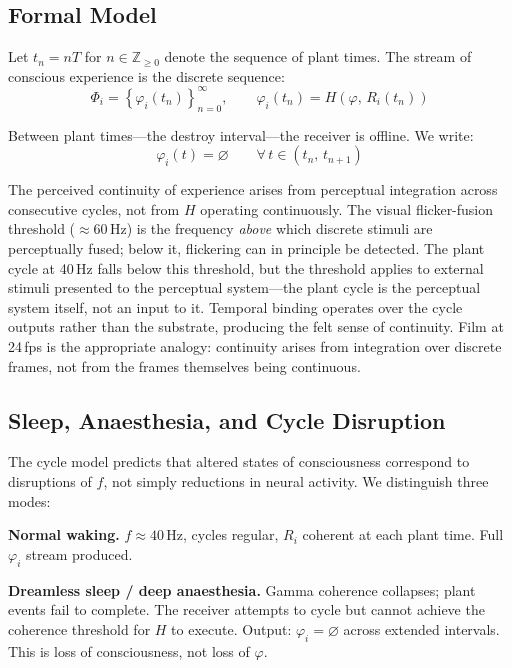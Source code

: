 \documentclass[12pt]{article}
\begin{document}
\subsection{Formal Model}

Let $t_n = nT$ for $n \in \mathbb{Z}_{\geq 0}$ denote the sequence of plant times. The stream of conscious experience is the discrete sequence:
\begin{equation}
    \Phi_i = \left\{\varphi_i(t_n)\right\}_{n=0}^{\infty}, \qquad \varphi_i(t_n) = H\!\left(\varphi,\, R_i(t_n)\right)
\end{equation}

Between plant times---the destroy interval---the receiver is offline. We write:
\begin{equation}
    \varphi_i(t) = \varnothing \qquad \forall\, t \in (t_n,\, t_{n+1})
\end{equation}

The perceived continuity of experience arises from perceptual integration across consecutive cycles, not from $H$ operating continuously. The visual flicker-fusion threshold ($\approx$60\,Hz) is the frequency \textit{above} which discrete stimuli are perceptually fused; below it, flickering can in principle be detected. The plant cycle at 40\,Hz falls below this threshold, but the threshold applies to external stimuli presented to the perceptual system---the plant cycle is the perceptual system itself, not an input to it. Temporal binding operates over the cycle outputs rather than the substrate, producing the felt sense of continuity. Film at 24\,fps is the appropriate analogy: continuity arises from integration over discrete frames, not from the frames themselves being continuous.

\subsection{Sleep, Anaesthesia, and Cycle Disruption}

The cycle model predicts that altered states of consciousness correspond to disruptions of $f$, not simply reductions in neural activity. We distinguish three modes:

\textbf{Normal waking.} $f \approx 40$\,Hz, cycles regular, $R_i$ coherent at each plant time. Full $\varphi_i$ stream produced.

\textbf{Dreamless sleep / deep anaesthesia.} Gamma coherence collapses; plant events fail to complete. The receiver attempts to cycle but cannot achieve the coherence threshold for $H$ to execute. Output: $\varphi_i = \varnothing$ across extended intervals. This is loss of consciousness, not loss of $\varphi$.
\end{document}
